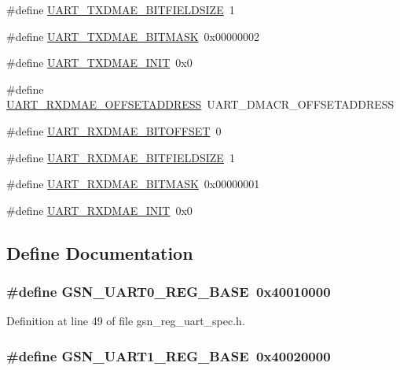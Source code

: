 \begin{DoxyCompactItemize}
\item 
\#define \hyperlink{a00575_ae8542070a7445d98df32fee7f1a02cac}{UART\_\-TXDMAE\_\-BITFIELDSIZE}~1
\item 
\#define \hyperlink{a00575_a6b38e08c9c573ef902dde64caec83b50}{UART\_\-TXDMAE\_\-BITMASK}~0x00000002
\item 
\#define \hyperlink{a00575_afbd857375e0203b5563db98cccad80d3}{UART\_\-TXDMAE\_\-INIT}~0x0
\item 
\#define \hyperlink{a00575_a4c2db4541265fb16b859ca10bce80cba}{UART\_\-RXDMAE\_\-OFFSETADDRESS}~UART\_\-DMACR\_\-OFFSETADDRESS
\item 
\#define \hyperlink{a00575_a51db438592f358bf5fe100b6e60945ec}{UART\_\-RXDMAE\_\-BITOFFSET}~0
\item 
\#define \hyperlink{a00575_a224059970fe5a7d296d03a60bd2ee4be}{UART\_\-RXDMAE\_\-BITFIELDSIZE}~1
\item 
\#define \hyperlink{a00575_a3e4f5fe70b54ca4f459fe65e1ec92d79}{UART\_\-RXDMAE\_\-BITMASK}~0x00000001
\item 
\#define \hyperlink{a00575_a0780f2a9cd4729cc41ea50111bc25d12}{UART\_\-RXDMAE\_\-INIT}~0x0
\end{DoxyCompactItemize}


\subsection{Define Documentation}
\hypertarget{a00575_ad2a4666b8d4948fa11e988fccf0d88f7}{
\subsubsection[{GSN\_\-UART0\_\-REG\_\-BASE}]{\setlength{\rightskip}{0pt plus 5cm}\#define GSN\_\-UART0\_\-REG\_\-BASE~0x40010000}}
\label{a00575_ad2a4666b8d4948fa11e988fccf0d88f7}


Definition at line 49 of file gsn\_\-reg\_\-uart\_\-spec.h.

\hypertarget{a00575_a561c2e1172058dd7aa531ae977dec5fd}{
\subsubsection[{GSN\_\-UART1\_\-REG\_\-BASE}]{\setlength{\rightskip}{0pt plus 5cm}\#define GSN\_\-UART1\_\-REG\_\-BASE~0x40020000}}
\label{a00575_a561c2e1172058dd7aa531ae977dec5fd}


